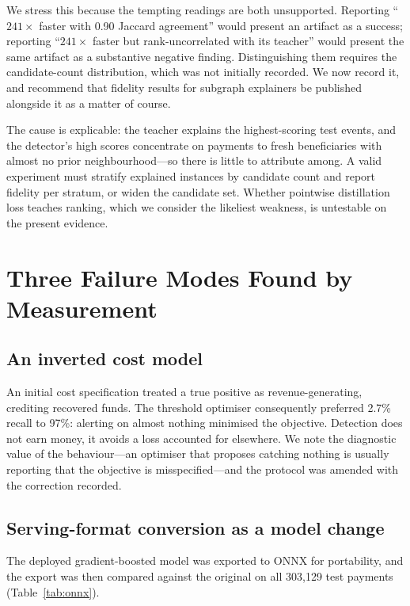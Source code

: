 \documentclass[conference]{IEEEtran}
\begin{document}
We stress this because the tempting readings are both unsupported. Reporting
``$241\times$ faster with 0.90 Jaccard agreement'' would present an artifact as
a success; reporting ``$241\times$ faster but rank-uncorrelated with its
teacher'' would present the same artifact as a substantive negative finding.
Distinguishing them requires the candidate-count distribution, which was not
initially recorded. We now record it, and recommend that fidelity results for
subgraph explainers be published alongside it as a matter of course.

The cause is explicable: the teacher explains the highest-scoring test events,
and the detector's high scores concentrate on payments to fresh beneficiaries
with almost no prior neighbourhood---so there is little to attribute among. A
valid experiment must stratify explained instances by candidate count and report
fidelity per stratum, or widen the candidate set. Whether pointwise distillation
loss teaches ranking, which we consider the likeliest weakness, is untestable on
the present evidence.

\section{Three Failure Modes Found by Measurement}
\label{sec:failures}

\subsection{An inverted cost model}

An initial cost specification treated a true positive as revenue-generating,
crediting recovered funds. The threshold optimiser consequently preferred
2.7\% recall to 97\%: alerting on almost nothing minimised the objective.
Detection does not earn money, it avoids a loss accounted for elsewhere. We note
the diagnostic value of the behaviour---an optimiser that proposes catching
nothing is usually reporting that the objective is misspecified---and the
protocol was amended with the correction recorded.

\subsection{Serving-format conversion as a model change}

The deployed gradient-boosted model was exported to ONNX for portability, and
the export was then compared against the original on all 303{,}129 test
payments (Table~\ref{tab:onnx}).
\end{document}
